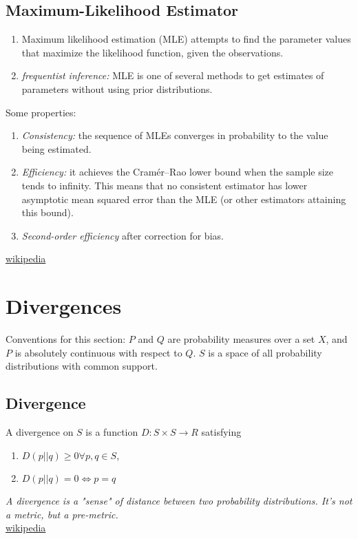 \subsection{Maximum-Likelihood Estimator}
\begin{enumerate}
	\item Maximum likelihood estimation (MLE) attempts to find the parameter values that maximize the likelihood function, given the observations.
	\item \textit{frequentist inference:} MLE is one of several methods to get estimates of parameters without using prior distributions.
\end{enumerate}
Some properties:
\begin{enumerate}
	\item \textit{Consistency:} the sequence of MLEs converges in probability to the value being estimated.
	\item \textit{Efficiency:} it achieves the Cramér–Rao lower bound when the sample size tends to infinity. This means that no consistent estimator has lower asymptotic mean squared error than the MLE (or other estimators attaining this bound).
	\item \textit{Second-order efficiency} after correction for bias.
\end{enumerate}
\href{https://en.wikipedia.org/wiki/Divergence_(statistics)}{wikipedia}



\section{Divergences}
Conventions for this section: $P$ and $Q$ are probability measures over a set $X$, and $P$ is absolutely continuous with respect to $Q$. $S$ is a space of all probability distributions with common support.
\subsection{Divergence}
A divergence on $S$ is a function $D: S \times S \rightarrow R$ satisfying
\begin{enumerate}
	\item $D(p || q) \geq 0  \forall p, q \in S$,
	\item $D(p || q) = 0 \Leftrightarrow p = q$
\end{enumerate}
\textit{A divergence is a "sense" of distance between two probability distributions. It's not a metric, but a pre-metric.}\\
\href{https://en.wikipedia.org/wiki/Divergence_(statistics)}{wikipedia}

